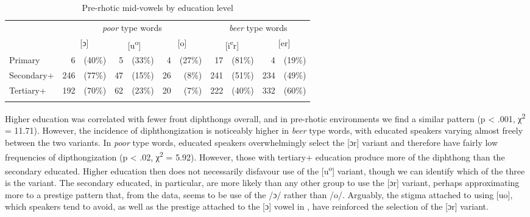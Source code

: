 \begin{table}
\begin{tabular}{l *{5}{r@{ }r}}
\lsptoprule
&  \multicolumn{6}{c}{\textit{poor}  type words} &  \multicolumn{4}{c}{\textit{beer} type words}\\\cmidrule(lr){2-7}\cmidrule(lr){8-11}
&   \multicolumn{2}{c}{[ɔ]}  &  \multicolumn{2}{c}{[u\textsuperscript{o}]}  &  \multicolumn{2}{c}{[o]}  & \multicolumn{2}{c}{[i\textsuperscript{e}r]} & \multicolumn{2}{c}{[er]}\\
\midrule
Primary     & 6  & (40\%)   &          5 & (33\%) &         4 & (27\%) & 17  & (81\%) &     4 & (19\%)\\
Secondary+ & 246 & (77\%)   &         47 & (15\%) &        26 & (8\%)  & 241 & (51\%) &   234 & (49\%)\\
Tertiary+  & 192 & (70\%)   &         62 & (23\%) &        20 & (7\%)  & 222 & (40\%) &   332 & (60\%)\\\lspbottomrule
\end{tabular}
\caption{Pre-rhotic mid-vowels by education level}
\label{tab:3.7}
\end{table}

Higher education was correlated with fewer front diphthongs overall, and in pre-rhotic environments we find a similar pattern (p < .001, χ\textsuperscript{2} = 11.71).  However, the incidence of diphthongization is noticeably higher in \textit{beer} type words, with educated speakers varying almost freely between the two variants.  In \textit{poor} type words, educated speakers overwhelmingly select the [ɔr] variant and therefore have fairly low frequencies of dipthongization (p < .02, χ\textsuperscript{2} = 5.92).  However, those with tertiary+ education produce more of the diphthong than the secondary educated.  Higher education then does not necessarily disfavour use of the [u\textsuperscript{o}] variant, though we can identify which of the three is the  variant.  The secondary educated, in particular, are more likely than any other group to use the [ɔr] variant, perhaps approximating more to a prestige pattern that, from the data, seems to be use of the /ɔ/ rather than /o/.  Arguably, the stigma attached to using [uo], which speakers tend to avoid, as well as the prestige attached to the [ɔ] vowel in , have reinforced the selection of the [ɔr] variant. 

